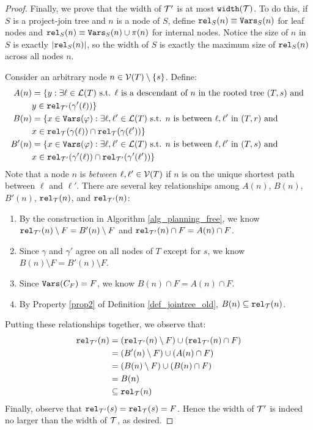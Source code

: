 \begin{proof}
Finally, we prove that the width of $\mathcal{T}'$ is at most $\texttt{\upshape width}(\mathcal{T})$. 
To do this, if $S$ is a project-join tree and $n$ is a node of $S$, define $\texttt{\upshape rel}_S(n) \equiv \texttt{\upshape Vars}_S(n)$ for leaf nodes and $\texttt{\upshape rel}_S(n) \equiv \texttt{\upshape Vars}_S(n) \cup \pi(n)$ for internal nodes. Notice the size of $n$ in $S$ is exactly $|\texttt{\upshape rel}_S(n)|$, so the width of $S$ is exactly the maximum size of $\texttt{\upshape rel}_S(n)$ across all nodes $n$. 

Consider an arbitrary node $n \in \mathcal{V}(T) \setminus \{s\}$. Define:
\begin{align*}
    A(n) &= \{ y : \exists \ell \in \mathcal{L}(T) \text{ s.t. $\ell$ is a descendant of $n$ in the rooted tree $(T, s)$ and } \\&y \in \texttt{\upshape rel}_{\mathcal{T}'}(\gamma'(\ell)) \} \\
    B(n) &= \{ x \in \texttt{\upshape Vars}(\varphi) : \exists \ell, \ell' \in \mathcal{L}(T) \text{ s.t. $n$ is between $\ell, \ell'$ in $(T, r)$ and } \\&x \in \texttt{\upshape rel}_{\mathcal{T}}(\gamma(\ell)) \cap \texttt{\upshape rel}_{\mathcal{T}}(\gamma(\ell')) \} \\
    B'(n) &= \{ x \in \texttt{\upshape Vars}(\varphi) : \exists \ell, \ell' \in \mathcal{L}(T) \text{ s.t. $n$ is between $\ell, \ell'$ in $(T, s)$ and } \\&x \in \texttt{\upshape rel}_{\mathcal{T}'}(\gamma'(\ell)) \cap \texttt{\upshape rel}_{\mathcal{T}'}(\gamma'(\ell')) \}
\end{align*}
Note that a node $n$ is \emph{between} $\ell, \ell' \in \mathcal{V}(T)$ if $n$ is on the unique shortest path between $\ell$ and $\ell'$. There are several key relationships among $A(n)$, $B(n)$, $B'(n)$, $\texttt{\upshape rel}_{\mathcal{T}}(n)$, and $\texttt{\upshape rel}_{\mathcal{T}'}(n)$: 
\begin{enumerate}
    \item By the construction in Algorithm \ref{alg_planning_free}, we know $\texttt{\upshape rel}_{\mathcal{T}'}(n) \setminus F = B'(n) \setminus F$ and $\texttt{\upshape rel}_{\mathcal{T}'}(n) \cap F = A(n) \cap F$.
    \item Since $\gamma$ and $\gamma'$ agree on all nodes of $T$ except for $s$, we know $B(n) \setminus F = B'(n) \setminus F$.
    \item Since $\texttt{\upshape Vars}(C_F) = F$, we know $B(n) \cap F = A(n) \cap F$.
    \item By Property \ref{prop2} of Definition \ref{def_jointree_old}, $B(n) \subseteq \texttt{\upshape rel}_{\mathcal{T}}(n)$. 
\end{enumerate}
Putting these relationships together, we observe that:
\begin{align*}
    \texttt{\upshape rel}_{\mathcal{T}'}(n) &= (\texttt{\upshape rel}_{\mathcal{T}'}(n) \setminus F) \cup (\texttt{\upshape rel}_{\mathcal{T}'}(n) \cap F) \\
    &= (B'(n) \setminus F) \cup (A(n) \cap F) \\
    &= (B(n) \setminus F) \cup (B(n) \cap F) \\
    &= B(n) \\
    &\subseteq \texttt{\upshape rel}_{\mathcal{T}}(n)
\end{align*}
Finally, observe that $\texttt{\upshape rel}_{\mathcal{T}'}(s) = \texttt{\upshape rel}_{\mathcal{T}}(s) = F$.
Hence the width of $\mathcal{T}'$ is indeed no larger than the width of $\mathcal{T}$, as desired.
\end{proof}

